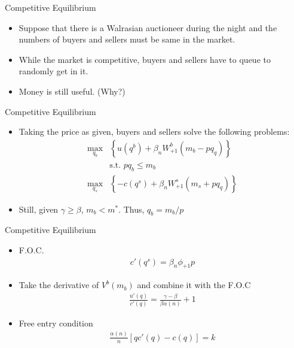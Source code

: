 \documentclass{beamer}
\begin{document}
\begin{frame}{Competitive Equilibrium}
    \begin{itemize}
        \item Suppose that there is a Walrasian auctioneer during the night and the numbers of buyers and sellers must be same in the market.
        \item While the market is competitive, buyers and sellers have to queue to randomly get in it.
        \item Money is still useful. (Why?)
    \end{itemize}
\end{frame}
\begin{frame}{Competitive Equilibrium}
    \begin{itemize}
        \item Taking the price as given, buyers and sellers solve the following problems:
        \begin{align*}
            \max_{q_{b}}&\left\{u(q^{b})+\beta_{n}W_{+1}^{b}(m_{b}-pq_{q})\right\}\\
            &\text{s.t. } pq_{b}\leq m_{b}\\
            \max_{q_{s}}&\left\{-c(q^{s})+\beta_{n}W_{+1}^{s}(m_{s}+pq_{q})\right\}
        \end{align*}
            \item Still, given $\gamma \geq \beta$, $m_{b} < m^{*}$. Thus, $q_{b} = m_{b}/p$
    \end{itemize}
\end{frame}

\begin{frame}{Competitive Equilibrium}
     \begin{itemize}
        \item F.O.C.
        \begin{align*}
            c'(q^{s}) = \beta_{n}\phi_{+1}p
         \end{align*}
         \item Take the derivative of $V^{b}(m_{b})$ and combine it with the F.O.C
        \begin{align*}
 \frac{u'(q)}{c'(q)} = \frac{\gamma-\beta}{\beta\alpha(n)}+1 
        \end{align*}
        \item Free entry condition
        \begin{align*}
            \frac{\alpha(n)}{n}\left[qc'(q)-c(q)\right] = k
        \end{align*}

        
    \end{itemize}  
\end{frame}
\end{document}

